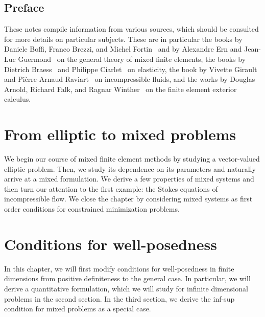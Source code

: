 
\maketitle

\section*{Preface}
%

These notes compile information from various sources, which should be
consulted for more details on particular subjects. These are in
particular the books by Daniele Boffi, Franco Brezzi, and Michel
Fortin~\cite{BoffiBrezziFortin13} and by Alexandre Ern and Jean-Luc
Guermond~\cite{ErnGuermond04} on the general theory of mixed finite
elements, the books by Dietrich Braess~\cite{Braess97,Braess13} and
Philippe Ciarlet~\cite{Ciarlet88} on elasticity, the book by Vivette
Girault and Pièrre-Arnaud Raviart~\cite{GiraultRaviart86} on
incompressible fluids, and the works by Douglas Arnold, Richard Falk,
and Ragnar Winther~\cite{ArnoldFalkWinther06acta,ArnoldFalkWinther10}
on the finite element exterior calculus.

\thispagestyle{empty}
\setcounter{page}{0}


\tableofcontents

\chapter{From elliptic to mixed problems}
We begin our course of mixed finite element methods by studying a
vector-valued elliptic problem. Then, we study its dependence on its
parameters and naturally arrive at a mixed formulation. We derive a
few properties of mixed systems and then turn our attention to the
first example: the Stokes equations of incompressible flow. We close
the chapter by considering mixed systems as first order conditions
for constrained minimization problems.




\chapter{Conditions for well-posedness}
\label{sec:mixed-wellposedness}
In this chapter, we will first modify conditions for well-posedness in
finite dimensions from positive definiteness to the general case. In
particular, we will derive a quantitative formulation, which we will
study for infinite dimensional problems in the second section. In the
third section, we derive the inf-sup condition for mixed problems as a
special case.


